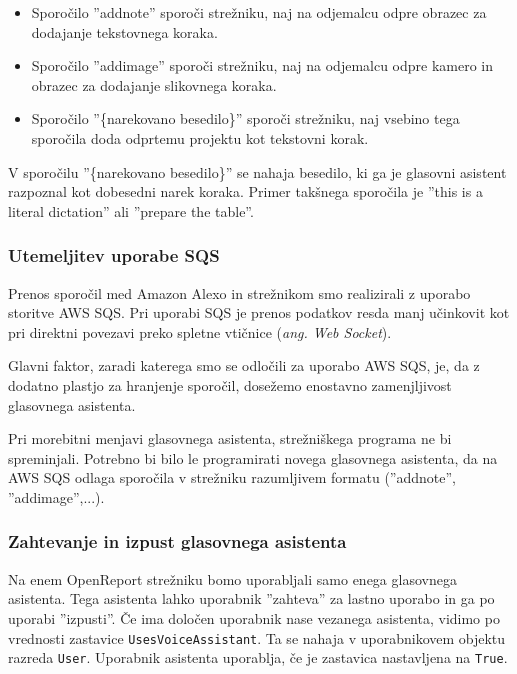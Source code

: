 \documentclass[a4paper, 12pt]{book}
\begin{document}
\begin{itemize}
	\item Sporočilo ''addnote'' sporoči strežniku, naj na odjemalcu odpre obrazec za dodajanje tekstovnega koraka.
	\item Sporočilo ''addimage'' sporoči strežniku, naj na odjemalcu odpre kamero in obrazec za dodajanje slikovnega koraka.
	\item Sporočilo ''\{narekovano besedilo\}'' sporoči strežniku, naj vsebino tega sporočila doda odprtemu projektu kot tekstovni korak.
\end{itemize}

V sporočilu ''\{narekovano besedilo\}'' se nahaja besedilo, ki ga je glasovni asistent razpoznal kot dobesedni narek koraka.
Primer takšnega sporočila je ''this is a literal dictation'' ali ''prepare the table''.

\subsubsection{Utemeljitev uporabe SQS}

Prenos sporočil med Amazon Alexo in strežnikom smo realizirali z uporabo storitve AWS SQS.
Pri uporabi SQS je prenos podatkov resda manj učinkovit kot pri direktni povezavi preko spletne vtičnice (\textit{ang. Web Socket}).

Glavni faktor, zaradi katerega smo se odločili za uporabo AWS SQS, je, da z dodatno plastjo za hranjenje sporočil, dosežemo enostavno zamenjljivost glasovnega asistenta.

Pri morebitni menjavi glasovnega asistenta, strežniškega programa ne bi spreminjali.
Potrebno bi bilo le programirati novega glasovnega asistenta, da na AWS SQS odlaga sporočila v strežniku razumljivem formatu (''addnote'', ''addimage'',...).

\subsubsection{Zahtevanje in izpust glasovnega asistenta}

Na enem OpenReport strežniku bomo uporabljali samo enega glasovnega asistenta.
Tega asistenta lahko uporabnik ''zahteva'' za lastno uporabo in ga po uporabi ''izpusti''.
Če ima določen uporabnik nase vezanega asistenta, vidimo po vrednosti zastavice \texttt{UsesVoiceAssistant}.
Ta se nahaja v uporabnikovem objektu razreda \texttt{User}.
Uporabnik asistenta uporablja, če je zastavica nastavljena na \texttt{True}.
\end{document}
